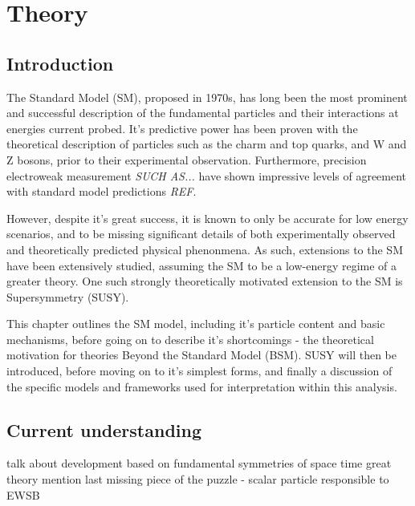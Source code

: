 
\chapter{Theory}
\label{ch:2}

\ifpdf
    \graphicspath{{Chapter2/Figs/Raster/}{Chapter2/Figs/PDF/}{Chapter2/Figs/}}
\else
    \graphicspath{{Chapter2/Figs/Vector/}{Chapter2/Figs/}}
\fi


\section{Introduction}  %
\label{sec:theory_intro}

The Standard Model (SM), proposed in 1970s, has long been the most prominent and 
successful description of the fundamental particles and their interactions at 
energies current probed. It's predictive power has been proven with the 
theoretical description of particles such as the charm and top quarks, and W and
Z bosons, prior to their experimental observation. Furthermore, precision 
electroweak measurement \emph{SUCH AS...} have shown impressive levels of 
agreement with standard model predictions \emph{REF}.

However, despite it's great success, it is known to only be accurate for low 
energy scenarios, and to be missing significant details of both experimentally 
observed and theoretically predicted physical phenonmena. As such, extensions to
the SM have been extensively studied, assuming the SM to be a low-energy 
regime of a greater theory. One such strongly theoretically motivated extension 
to the SM is Supersymmetry (SUSY).

This chapter outlines the SM model, including it's particle content and basic 
mechanisms, before going on to describe it's shortcomings - the theoretical 
motivation for theories Beyond the Standard Model (BSM). SUSY will then be 
introduced, before moving on to it's simplest forms, and finally a discussion of
the specific models and frameworks used for interpretation within this analysis.

\section{Current understanding}
\label{sec:theory_current}
talk about development
based on fundamental symmetries of space time
great theory
mention last missing piece of the puzzle - scalar particle responsible to EWSB

